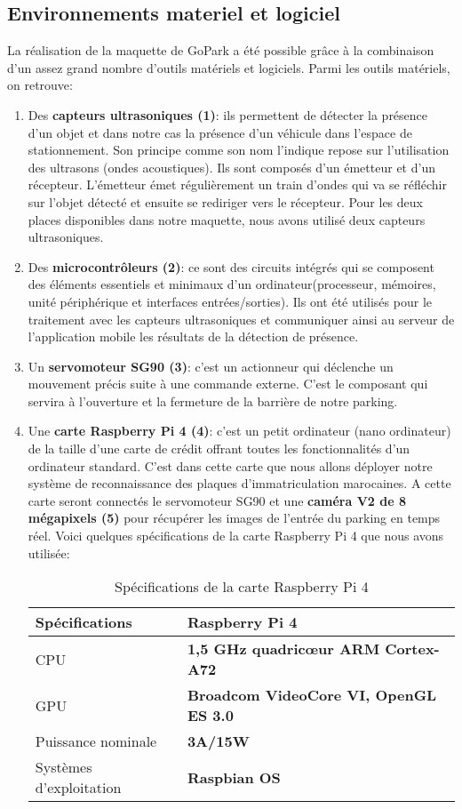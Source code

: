     \subsection{Environnements materiel et logiciel}
    La réalisation de la maquette de GoPark a été possible grâce à la combinaison d’un assez grand nombre d’outils matériels et logiciels. Parmi les outils matériels, on retrouve:
    \begin{enumerate}
        \item Des \textbf{capteurs ultrasoniques (1)}: ils permettent de détecter la présence d’un objet et dans notre cas la présence d’un véhicule dans l’espace de stationnement. Son principe comme son nom l’indique repose sur l’utilisation des ultrasons (ondes acoustiques). Ils sont composés d’un émetteur et d’un récepteur. L’émetteur émet régulièrement un train d’ondes qui va se réfléchir sur l’objet détecté et ensuite se rediriger vers le récepteur. Pour les deux places disponibles dans notre maquette, nous avons utilisé deux capteurs ultrasoniques.
        \item Des \textbf{microcontrôleurs (2)}: ce sont des circuits intégrés qui se composent des éléments essentiels et minimaux d’un ordinateur(processeur, mémoires, unité périphérique et interfaces entrées/sorties). Ils ont été utilisés pour le traitement avec les capteurs ultrasoniques et communiquer ainsi au serveur de l’application mobile les résultats de la détection de présence.
        \item Un \textbf{servomoteur SG90 (3)}:  c’est un actionneur qui déclenche un mouvement précis suite à une commande externe. C’est le composant qui servira à l’ouverture et la fermeture de la barrière de notre parking.
        \item Une \textbf{carte Raspberry Pi 4 (4)}: c'est un petit ordinateur (nano ordinateur) de la taille d'une carte de crédit offrant toutes les fonctionnalités d’un ordinateur standard. C’est dans cette carte que nous allons déployer notre système de reconnaissance des plaques d’immatriculation marocaines. A cette carte seront connectés le servomoteur SG90 et une \textbf{caméra V2 de 8 mégapixels (5)} pour récupérer les images de l’entrée du parking en temps réel. Voici quelques spécifications de la carte Raspberry Pi 4 que nous avons utilisée:
        \begin{table}[H]
            \centering
            \begin{tabular}{|l|l|}
                \hline
                \rowcolor{Gray}
                \textbf{Spécifications} & \textbf{Raspberry Pi 4} \\ \hline
                CPU & \textbf{1,5 GHz quadricœur ARM Cortex-A72} \\ \hline
                GPU & \textbf{Broadcom VideoCore VI, OpenGL ES 3.0} \\ \hline
                Puissance nominale  & \textbf{3A/15W} \\ \hline
                Systèmes d’exploitation & \textbf{Raspbian OS} \\ \hline
            \end{tabular}
            \caption{Spécifications de la carte Raspberry Pi 4}
        \end{table}
    \end{enumerate}
